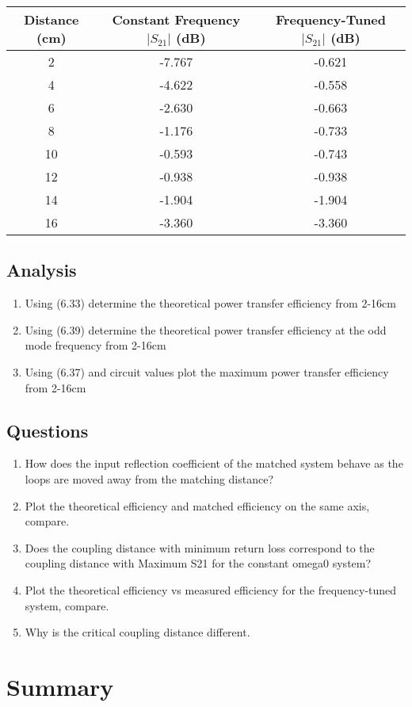 \documentclass{article}
\begin{document}
\begin{table}[H]
\centering
\begin{tabular}{|c|c|c|}
\hline
Distance (cm) & Constant Frequency $\vert S_{21}\vert$ (dB) 
& Frequency-Tuned $\vert S_{21}\vert$ (dB) \\ \hline
2             & -7.767                          & -0.621                       \\ \hline
4             & -4.622                          & -0.558                       \\ \hline
6             & -2.630                          & -0.663                       \\ \hline
8             & -1.176                          & -0.733                       \\ \hline
10            & -0.593                          & -0.743                       \\ \hline
12            & -0.938                          & -0.938                       \\ \hline
14            & -1.904                          & -1.904                       \\ \hline
16            & -3.360                          & -3.360                       \\ \hline
\end{tabular}
\end{table}

\subsection{Analysis}

\begin{enumerate}
	\item Using (6.33) determine the theoretical power transfer efficiency from 2-16cm
	\item Using (6.39) determine the theoretical power transfer efficiency at the odd mode frequency from 2-16cm
	\item Using (6.37) and circuit values plot the maximum power transfer efficiency from 2-16cm
\end{enumerate}

\subsection{Questions}

\begin{enumerate}
	\item How does the input reflection coefficient of the matched system behave as the loops are moved away from the matching distance?
	\item Plot the theoretical efficiency and matched efficiency on the same axis, compare.
	\item Does the coupling distance with minimum return loss correspond to the coupling distance with Maximum S21 for the constant omega0 system?
	\item Plot the theoretical efficiency vs measured efficiency for the frequency-tuned system, compare.
	\item Why is the critical coupling distance different.
\end{enumerate}

\section{Summary}
\end{document}
